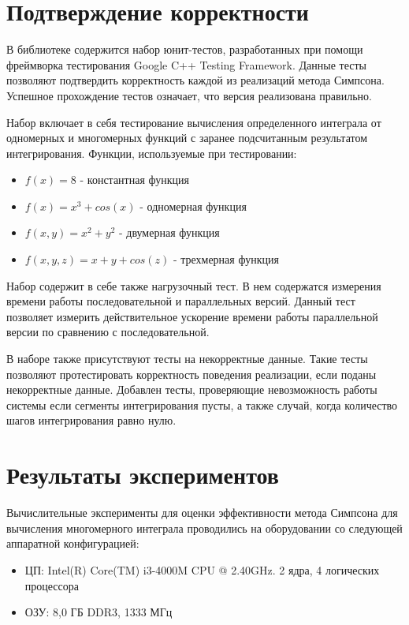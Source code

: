 \documentclass{report}
\begin{document}
\newpage

\section*{Подтверждение корректности}
В библиотеке содержится набор юнит-тестов, разработанных при помощи фреймворка тестирования Google C++ Testing Framework. Данные тесты позволяют подтвердить корректность каждой из реализаций метода Симпсона. Успешное прохождение тестов означает, что версия реализована правильно.
\par Набор включает в себя тестирование вычисления определенного интеграла от одномерных и многомерных функций с заранее подсчитанным результатом интегрирования. Функции, используемые при тестировании:
\begin{itemize}
\item $f(x)=8$ - константная функция
\item $f(x)=x^3 + cos(x)$ - одномерная функция
\item $f(x,y)=x^2 + y^2$ - двумерная функция
\item $f(x,y,z)=x + y + cos(z)$ - трехмерная функция
\end{itemize}

\par Набор содержит в себе также нагрузочный тест. В нем содержатся измерения времени работы последовательной и параллельных версий. Данный тест позволяет измерить действительное ускорение времени работы параллельной версии по сравнению с последовательной.
\par В наборе также присутствуют тесты на некорректные данные. Такие тесты позволяют протестировать корректность поведения реализации, если поданы некорректные данные. Добавлен тесты, проверяющие невозможность работы системы если сегменты интегрирования пусты, а также случай, когда количество шагов интегрирования равно нулю.

\newpage

\section*{Результаты экспериментов}
Вычислительные эксперименты для оценки эффективности метода Симпсона для вычисления многомерного интеграла проводились на оборудовании со следующей аппаратной конфигурацией:

\begin{itemize}
\item ЦП: Intel(R) Core(TM) i3-4000M CPU @ 2.40GHz. 2 ядра, 4 логических процессора
\item ОЗУ: 8,0 ГБ DDR3, 1333 МГц
\end{itemize}
\end{document}
